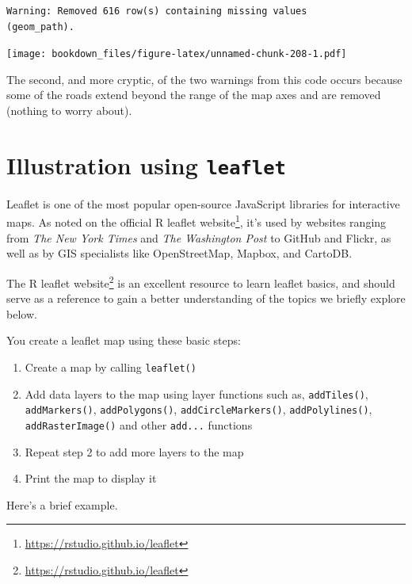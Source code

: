 \documentclass[
]{krantz}
\providecommand{\tightlist}{%
  \setlength{\itemsep}{0pt}\setlength{\parskip}{0pt}}
\renewcommand{\href}[2]{#2\footnote{\url{#1}}}
\begin{document}
\begin{verbatim}
Warning: Removed 616 row(s) containing missing values
(geom_path).
\end{verbatim}

\texttt{[image: bookdown\_files/figure-latex/unnamed-chunk-208-1.pdf]}

The second, and more cryptic, of the two warnings from this code occurs because some of the roads extend beyond the range of the map axes and are removed (nothing to worry about).

\hypertarget{illustration-using-leaflet}{%
\section{\texorpdfstring{Illustration using \texttt{leaflet}}{Illustration using leaflet}}\label{illustration-using-leaflet}}

Leaflet is one of the most popular open-source JavaScript libraries for interactive maps. As noted on the official \href{https://rstudio.github.io/leaflet}{R leaflet website}, it's used by websites ranging from \emph{The New York Times} and \emph{The Washington Post} to GitHub and Flickr, as well as by GIS specialists like OpenStreetMap, Mapbox, and CartoDB.

The \href{https://rstudio.github.io/leaflet}{R leaflet website} is an excellent resource to learn leaflet basics, and should serve as a reference to gain a better understanding of the topics we briefly explore below.

You create a leaflet map using these basic steps:

\begin{enumerate}
\def\labelenumi{\arabic{enumi}.}
\tightlist
\item
  Create a map by calling \texttt{leaflet()}
\item
  Add data layers to the map using layer functions such as, \texttt{addTiles()}, \texttt{addMarkers()}, \texttt{addPolygons()}, \texttt{addCircleMarkers()}, \texttt{addPolylines()}, \texttt{addRasterImage()} and other \texttt{add...} functions
\item
  Repeat step 2 to add more layers to the map
\item
  Print the map to display it
\end{enumerate}

Here's a brief example.
\end{document}
